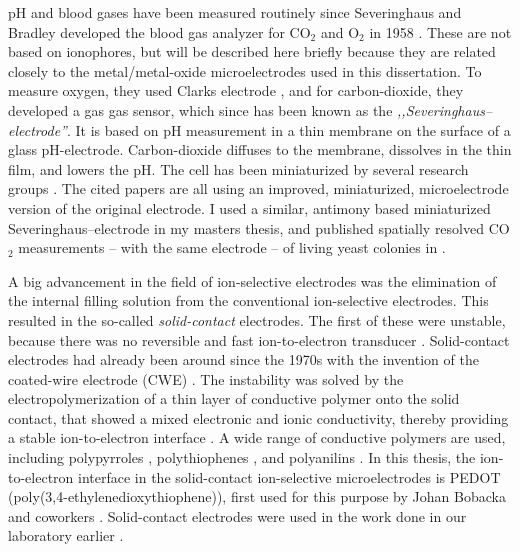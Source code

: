 pH and blood gases have been measured routinely since Severinghaus and Bradley developed the blood gas analyzer for CO$_2$ and O$_2$ in 1958 \cite{severinghaus1958electrodes}.
These are not based on ionophores, but will be described here briefly because they are related closely to the metal/metal-oxide microelectrodes used in this dissertation.
To measure oxygen, they used Clarks electrode \cite{clark1953continuous}, and for carbon-dioxide, they developed a gas gas sensor, which since has been known as the \emph{,,Severinghaus--electrode''}.
It is based on pH measurement in a thin membrane on the surface of a glass pH-electrode.
Carbon-dioxide diffuses to the membrane, dissolves in the thin film, and lowers the pH.
The cell has been miniaturized by several research groups \cite{cai1993development, de1997fast, zhao1997improved, hanstein2001miniaturised, beyenal2004improved}.
The cited papers are all using an improved, miniaturized, microelectrode version of the original electrode.
I used a similar, antimony based miniaturized Severinghaus--electrode in my masters thesis, and published spatially resolved CO$_2$ measurements -- with the same electrode -- of living yeast colonies in \cite{kiss2011air}.

A big advancement in the field of ion-selective electrodes was the elimination of the internal filling solution from the conventional ion-selective electrodes.
This resulted in the so-called \emph{solid-contact} electrodes.
The first of these were unstable, because there was no reversible and fast ion-to-electron transducer \cite{nikolskii1985solid}.
Solid-contact electrodes had already been around since the 1970s with the invention of the coated-wire electrode (CWE) \cite{cattrall1971coated}.
The instability was solved by the electropolymerization of a thin layer of conductive polymer onto the solid contact, that showed a mixed electronic and ionic conductivity, thereby providing a stable ion-to-electron interface \cite{bobacka2003potentiometric, bobacka2004all, bobacka2006conducting, michalska2006optimizing}.
A wide range of conductive polymers are used, including polypyrroles \cite{sun2004construction}, polythiophenes \cite{bobacka1994all}, and polyanilins \cite{paciorek2005miniature}.
In this thesis, the ion-to-electron interface in the solid-contact ion-selective microelectrodes is PEDOT (poly(3,4-ethylenedioxythiophene)), first used for this purpose by Johan Bobacka and coworkers \cite{bobacka1994all}.
Solid-contact electrodes were used in the work done in our laboratory earlier \cite{gyetvai2007solid, varga2011development, izquierdo2012scanning}.

